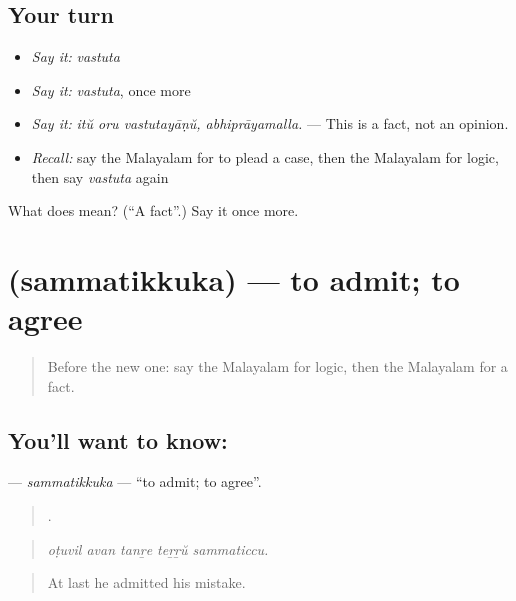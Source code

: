 \subsection*{Your turn}
\begin{itemize}
\raggedright
  \item \emph{Say it:} \emph{vastuta}
  \item \emph{Say it:} \emph{vastuta}, once more
  \item \emph{Say it:} \emph{itŭ oru vastutayāṇŭ, abhiprāyamalla.} — This is a fact, not an opinion.
  \item \emph{Recall:} say the Malayalam for to plead a case, then the Malayalam for logic, then say \emph{vastuta} again
\end{itemize}

\begin{tcolorbox}[breakable,colback=teal!4,colframe=teal!35!black,title={Before you move on}]
What does  mean? (\textquotedblleft{}A fact\textquotedblright{}.) Say it once more.
\end{tcolorbox}
\section[\texorpdfstring{\ml{സമ്മതിക്കുക} (sammatikkuka)}{സമ്മതിക്കുക (sammatikkuka)}]{ (sammatikkuka) — to admit; to agree}

\label{lesson:ML-C405-sammatikkuka}



\begin{quote}
Before the new one: say the Malayalam for logic, then the Malayalam for a fact.
\end{quote}

\subsection*{You'll want to know: }
\textbf{} — \emph{sammatikkuka} — \textquotedblleft{}to admit; to agree\textquotedblright{}.

\begin{quote}
    .
\end{quote}

\begin{quote}
\emph{oṭuvil avan tanṟe teṟṟŭ sammaticcu.}
\end{quote}

\begin{quote}
At last he admitted his mistake.
\end{quote}

